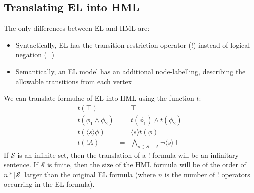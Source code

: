 \subsection{Translating EL into HML}
The only differences between EL and HML are:
\begin{itemize}
\item
Syntactically, EL has the transition-restriction operator ($!$) instead of logical negation ($\neg$)
\item
Semantically, an EL model has an additional node-labelling, describing the allowable transitions from each vertex
\end{itemize}
We can translate formulae of EL into HML using the function $t$:
\begin{eqnarray}
t(\top) & = & \top \nonumber \\
t(\phi_1 \land \phi_2) & = & t(\phi_1) \land t(\phi_2) \nonumber \\
t(\langle s \rangle \phi) & = & \langle s \rangle t(\phi) \nonumber \\
t(! A) & = & \bigwedge_{s \in S - A} \neg \langle s \rangle \top \nonumber
\end{eqnarray}
If $\mathcal{S}$ is an infinite set, then the translation of a $!$ formula will be an infinitary sentence.
If $\mathcal{S}$ is finite, then the size of the HML formula will be of the order of $n * |\mathcal{S}|$ larger than the original EL formula (where $n$ is the number of $!$ operators occurring in the EL formula).

